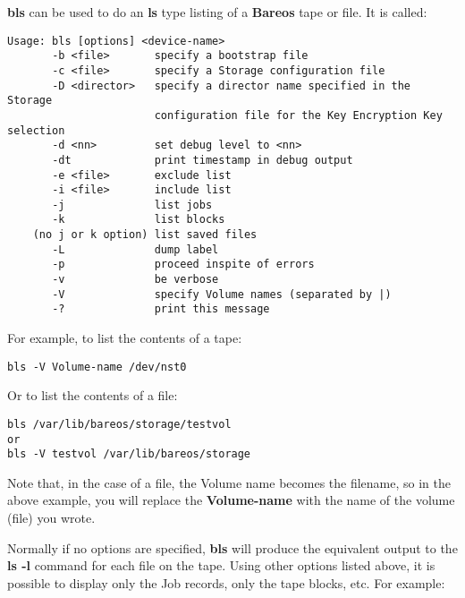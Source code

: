 {\bf bls} can be used to do an {\bf ls} type listing of a {\bf Bareos} tape or
file. It is called:

\footnotesize
\begin{verbatim}
Usage: bls [options] <device-name>
       -b <file>       specify a bootstrap file
       -c <file>       specify a Storage configuration file
       -D <director>   specify a director name specified in the Storage
                       configuration file for the Key Encryption Key selection
       -d <nn>         set debug level to <nn>
       -dt             print timestamp in debug output
       -e <file>       exclude list
       -i <file>       include list
       -j              list jobs
       -k              list blocks
    (no j or k option) list saved files
       -L              dump label
       -p              proceed inspite of errors
       -v              be verbose
       -V              specify Volume names (separated by |)
       -?              print this message
\end{verbatim}
\normalsize

For example, to list the contents of a tape:

\footnotesize
\begin{verbatim}
bls -V Volume-name /dev/nst0
\end{verbatim}
\normalsize

Or to list the contents of a file:

\footnotesize
\begin{verbatim}
bls /var/lib/bareos/storage/testvol
or
bls -V testvol /var/lib/bareos/storage
\end{verbatim}
\normalsize

Note that, in the case of a file, the Volume name becomes the filename, so in
the above example, you will replace the {\bf Volume-name} with the name of the volume
(file) you wrote.

Normally if no options are specified, {\bf bls} will produce the equivalent
output to the {\bf ls -l} command for each file on the tape. Using other
options listed above, it is possible to display only the Job records, only the
tape blocks, etc. For example:

